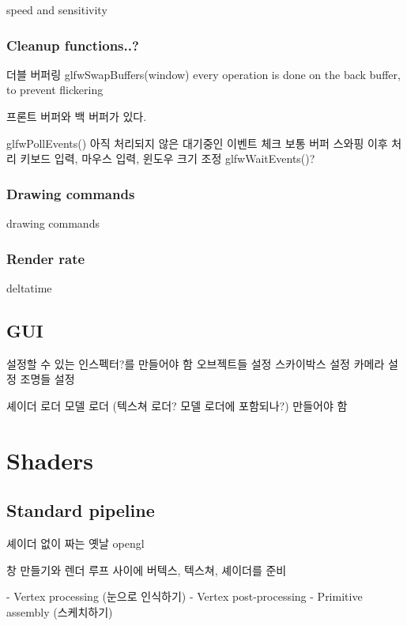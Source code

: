 \documentclass[a4paper]{report}
\begin{document}
speed and sensitivity


\subsection{Cleanup functions..?}

더블 버퍼링
glfwSwapBuffers(window)
	every operation is done on the back buffer, to prevent flickering

프론트 버퍼와 백 버퍼가 있다.


glfwPollEvents()
아직 처리되지 않은 대기중인 이벤트 체크
보통 버퍼 스와핑 이후 처리
키보드 입력, 마우스 입력, 윈도우 크기 조정
glfwWaitEvents()?

\subsection{Drawing commands}
drawing commands


\subsection{Render rate}
deltatime




\section{GUI}
설정할 수 있는 인스펙터?를 만들어야 함
	오브젝트들 설정	
	스카이박스 설정
	카메라 설정
	조명들 설정


셰이더 로더
모델 로더
(텍스쳐 로더? 모델 로더에 포함되나?)
만들어야 함





\chapter{Shaders}





\section{Standard pipeline}

셰이더 없이 짜는 옛날 opengl



창 만들기와 렌더 루프 사이에 버텍스, 텍스쳐, 셰이더를 준비

- Vertex processing (눈으로 인식하기)
- Vertex post-processing
- Primitive assembly (스케치하기)
\end{document}
